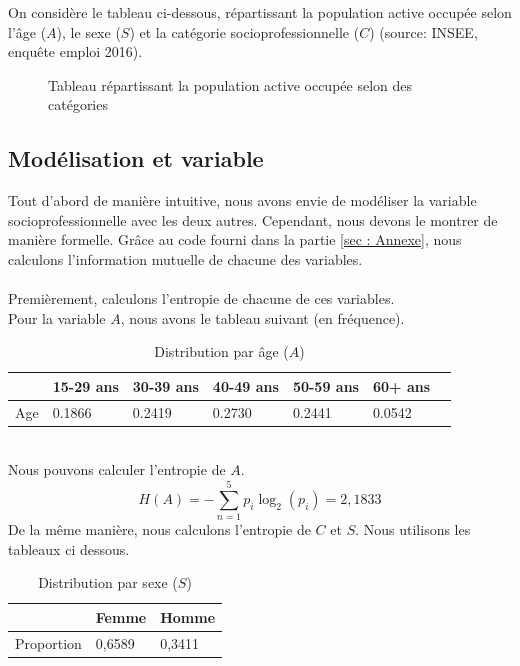 \documentclass{article}
\begin{document}
On considère le tableau ci-dessous, répartissant la population active occupée selon l'âge ($A$), le sexe ($S$) et la
catégorie socioprofessionnelle ($C$) (source: INSEE, enquête emploi 2016).
\begin{figure}[ht]
  \centering
  \setlength{\fboxsep}{0pt}  %
  \setlength{\fboxrule}{1pt}  %
  \caption{Tableau répartissant la population active occupée selon des catégories }
\end{figure}
\subsection{Modélisation et variable}
\label{1.1}
Tout d'abord de manière intuitive, nous avons envie de modéliser la variable
socioprofessionnelle avec les deux autres. Cependant, nous devons
le montrer de manière formelle. Grâce au code fourni dans la partie \ref{sec : Annexe},
nous calculons l'information mutuelle de chacune des variables.\\\\
Premièrement, calculons l'entropie de chacune de ces variables.\\
Pour la variable $A$, nous avons le tableau suivant (en fréquence). 
\begin{table}[ht]
  \centering
  \caption{Distribution par âge ($A$)}
  \begin{tabular}{|l|l|l|l|l|l|l|}
    \hline
    & 15-29 ans  & 30-39 ans  & 40-49 ans  & 50-59 ans  & 60+ ans \\ \hline
    Age & 0.1866 & 0.2419 & 0.2730 & 0.2441 & 0.0542 \\ \hline
  \end{tabular}
\end{table}
\\Nous pouvons calculer l'entropie de $A$.\\
\[
H(A) = -\sum_{n = 1}^{5}p_i\log_2(p_i)=2,1833
\]
De la même manière, nous calculons l'entropie de $C$ et $S$. Nous utilisons les tableaux ci dessous.\\
\begin{table}[H]
  \centering
  \caption{Distribution par sexe ($S$)}
  \begin{tabular}{|l|l|l|}
  \hline
             & Femme  & Homme  \\ \hline
  Proportion & 0,6589 & 0,3411 \\ \hline
  \end{tabular}
\end{table}
\end{document}
